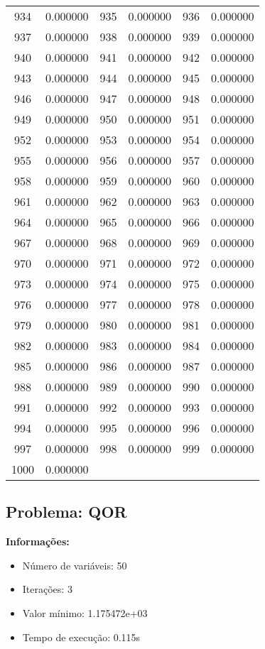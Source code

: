 \documentclass[12pt]{article}
\begin{document}
\begin{longtable}{@{}cc|cc|cc@{}}
934 & 0.000000 & 935 & 0.000000 & 936 & 0.000000 \\
937 & 0.000000 & 938 & 0.000000 & 939 & 0.000000 \\
940 & 0.000000 & 941 & 0.000000 & 942 & 0.000000 \\
943 & 0.000000 & 944 & 0.000000 & 945 & 0.000000 \\
946 & 0.000000 & 947 & 0.000000 & 948 & 0.000000 \\
949 & 0.000000 & 950 & 0.000000 & 951 & 0.000000 \\
952 & 0.000000 & 953 & 0.000000 & 954 & 0.000000 \\
955 & 0.000000 & 956 & 0.000000 & 957 & 0.000000 \\
958 & 0.000000 & 959 & 0.000000 & 960 & 0.000000 \\
961 & 0.000000 & 962 & 0.000000 & 963 & 0.000000 \\
964 & 0.000000 & 965 & 0.000000 & 966 & 0.000000 \\
967 & 0.000000 & 968 & 0.000000 & 969 & 0.000000 \\
970 & 0.000000 & 971 & 0.000000 & 972 & 0.000000 \\
973 & 0.000000 & 974 & 0.000000 & 975 & 0.000000 \\
976 & 0.000000 & 977 & 0.000000 & 978 & 0.000000 \\
979 & 0.000000 & 980 & 0.000000 & 981 & 0.000000 \\
982 & 0.000000 & 983 & 0.000000 & 984 & 0.000000 \\
985 & 0.000000 & 986 & 0.000000 & 987 & 0.000000 \\
988 & 0.000000 & 989 & 0.000000 & 990 & 0.000000 \\
991 & 0.000000 & 992 & 0.000000 & 993 & 0.000000 \\
994 & 0.000000 & 995 & 0.000000 & 996 & 0.000000 \\
997 & 0.000000 & 998 & 0.000000 & 999 & 0.000000 \\
1000 & 0.000000 &  &  &  &  \\

\end{longtable}


\newpage            
\subsection{Problema: QOR}

\textbf{Informações:}
\begin{itemize}
\item Número de variáveis: 50
\item Iterações: 3
\item Valor mínimo: 1.175472e+03
\item Tempo de execução: 0.115s
\end{itemize}
\end{document}
